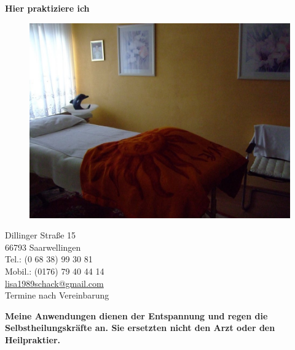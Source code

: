 \documentclass[10pt,foldmark,notumble]{leaflet}
\begin{document}
\newpage
\vspace*{30mm}
\centerline {\LARGE {\bf {Hier praktiziere ich}}}

\begin{figure}[h]
\includegraphics [scale=.25]{Bild1.jpg}
\end{figure}


\vspace*{7mm}
\begin{flushleft}
Dillinger Straße 15\\
66793 Saarwellingen\\
Tel.: (0 68 38) 99 30 81\\
Mobil.: (0176) 79 40 44 14\\
\href{mailto:lisa1989schack@gmail.com}{lisa1989schack@gmail.com} \\
\vspace{2mm}
\large{Termine nach Vereinbarung} %
\end{flushleft}

{\bf Meine Anwendungen dienen der Entspannung und regen die Selbstheilungskräfte an. Sie ersetzten nicht den Arzt oder den Heilpraktier. }


\newpage
\vspace*{30mm}
\end{document}
